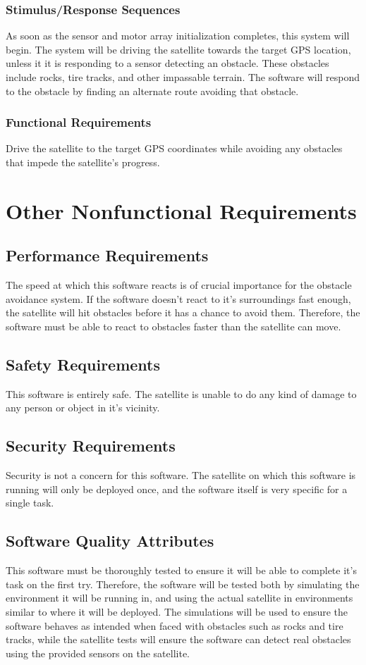 \documentclass{scrreprt}
\begin{document}
\subsection{Stimulus/Response Sequences}
As soon as the sensor and motor array initialization completes, this system will begin. The system will be driving the satellite towards the target GPS location, unless it it is responding to a sensor detecting an obstacle. These obstacles include rocks, tire tracks, and other impassable terrain. The software will respond to the obstacle by finding an alternate route avoiding that obstacle. 

\subsection{Functional Requirements}
Drive the satellite to the target GPS coordinates while avoiding any obstacles that impede the satellite's progress.

\chapter{Other Nonfunctional Requirements}

\section{Performance Requirements}
The speed at which this software reacts is of crucial importance for the obstacle avoidance system. If the software doesn't react to it's surroundings fast enough, the satellite will hit obstacles before it has a chance to avoid them. Therefore, the software must be able to react to obstacles faster than the satellite can move. 

\section{Safety Requirements}
This software is entirely safe. The satellite is unable to do any kind of damage to any person or object in it's vicinity.

\section{Security Requirements}
Security is not a concern for this software. The satellite on which this software is running will only be deployed once, and the software itself is very specific for a single task. 

\section{Software Quality Attributes}
This software must be thoroughly tested to ensure it will be able to complete it's task on the first try. Therefore, the software will be tested both by simulating the environment it will be running in, and using the actual satellite in environments similar to where it will be deployed. The simulations will be used to ensure the software behaves as intended when faced with obstacles such as rocks and tire tracks, while the satellite tests will ensure the software can detect real obstacles using the provided sensors on the satellite.
\end{document}
